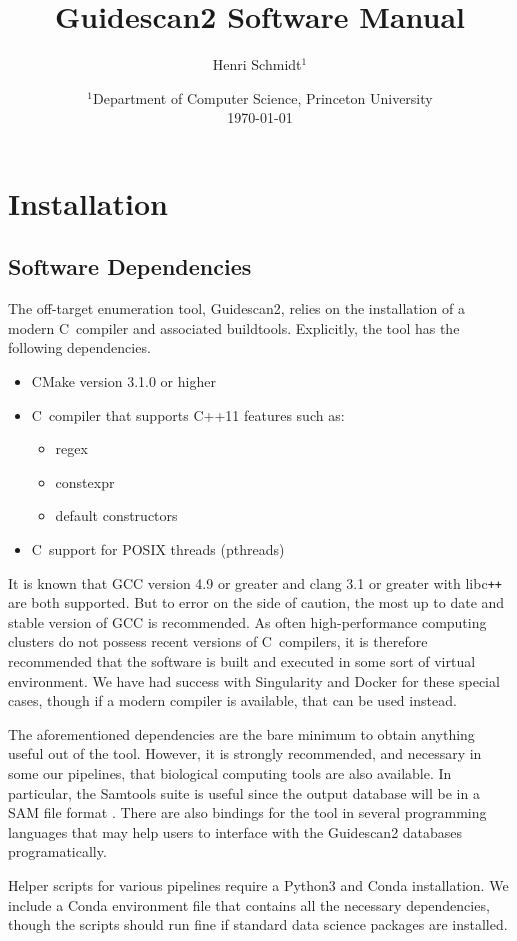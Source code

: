\documentclass[11pt]{article}
\author{Henri Schmidt$^1$}
\title{Guidescan2 Software Manual}
\date{
    $^1$Department of Computer Science, Princeton University\\[2ex]%
    \today
}
\newcommand{\CC}{C\nolinebreak\hspace{-.05em}\raisebox{.4ex}{\tiny\bf
    +}\nolinebreak\hspace{-.10em}\raisebox{.4ex}{\tiny\bf +}}
\def\CC{{C\nolinebreak[4]\hspace{-.05em}\raisebox{.4ex}{\tiny\bf ++}}}
\begin{document}
\maketitle
\tableofcontents
\newpage

\section{Installation}
\subsection{Software Dependencies}
The off-target enumeration tool, Guidescan2, relies on the
installation of a modern \CC\ compiler and associated
buildtools. Explicitly, the tool has the following dependencies.
\begin{itemize}
\item CMake version 3.1.0 or higher
\item \CC\ compiler that supports C++11 features such as:
  \begin{itemize}
  \item regex
  \item constexpr
  \item default constructors
  \end{itemize}
\item \CC\ support for POSIX threads (pthreads) 
\end{itemize}
It is known that GCC version 4.9 or greater and clang 3.1 or greater
with libc\texttt{++} are both supported. But to error on the side of caution,
the most up to date and stable version of GCC is recommended. As often
high-performance computing clusters do not possess recent versions of
\CC\ compilers, it is therefore recommended that the software is built
and executed in some sort of virtual environment. We have had success
with Singularity and Docker for these special cases, though if a
modern compiler is available, that can be used instead.

The aforementioned dependencies are the bare minimum to obtain
anything useful out of the tool. However, it is strongly recommended,
and necessary in some our pipelines, that biological computing tools
are also available. In particular, the Samtools suite is useful since
the output database will be in a SAM file format
\parencite{danecek2021twelve}. There are also bindings for the tool in
several programming languages that may help users to interface with
the Guidescan2 databases programatically.

Helper scripts for various pipelines require a Python3 and Conda
installation. We include a Conda environment file that contains all
the necessary dependencies, though the scripts should run fine if
standard data science packages are installed. 
\end{document}
